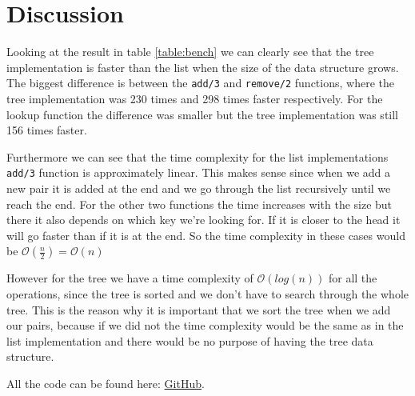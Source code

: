 \documentclass[a4paper,11pt]{article}
\begin{document}
\FloatBarrier
\section*{Discussion}
Looking at the result in table \ref{table:bench} we can clearly see that the tree implementation is faster than the list when the size of the data
structure grows. The biggest difference is between the {\tt add/3} and {\tt remove/2} functions, where the tree implementation was 230 times and 298
times faster respectively. For the lookup function the difference was smaller but the tree implementation was still 156 times faster. 

Furthermore we can see that the time complexity for the list implementations {\tt add/3} function is approximately linear. This makes sense since when
we add a new pair it is added at the end and we go through the list recursively until we reach the end. For the other two functions the time increases 
with the size but there it also depends on which key we're looking for. If it is closer to the head it will go faster than if it is at the end. So the 
time complexity in these cases would be $\mathcal{O}(\frac{n}{2}) = \mathcal{O}(n)$

However for the tree we have a time complexity of $\mathcal{O}(log(n))$ for all the operations, since the tree is sorted and we don't have to search 
through the whole tree. This is the reason why it is important that we sort the tree when we add our pairs, because if we did not the time complexity 
would be the same as in the list implementation and there would be no purpose of having the tree data structure. 

All the code can be found here: \href{https://github.com/adrian-jonsson-sjoedin/ID1019-Programming-II/tree/main/Task2_Solution}{GitHub}.
\end{document}
